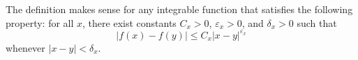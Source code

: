 \begin{rmk}
    The definition makes sense for any integrable function that satisfies the following property: for all $x$, there exist constants $C_x > 0$, $\varepsilon_x > 0$, and $\delta_x > 0$ such that
\[
|f(x) - f(y)| \leqslant C_x |x-y|^{\varepsilon_x}
\]
whenever $|x-y| < \delta_x$.
\end{rmk}